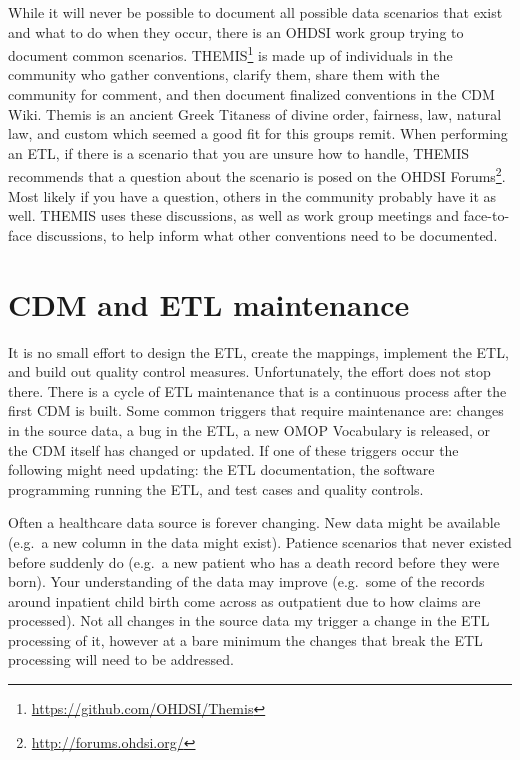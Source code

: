\documentclass[11pt]{book}
\let\rmarkdownfootnote\footnote%
\def\footnote{\protect\rmarkdownfootnote}
\theoremstyle{definition}
\theoremstyle{definition}
\theoremstyle{definition}
\theoremstyle{remark}
\begin{document}
While it will never be possible to document all possible data scenarios that exist and what to do when they occur, there is an OHDSI work group trying to document common scenarios. THEMIS\footnote{\url{https://github.com/OHDSI/Themis}} is made up of individuals in the community who gather conventions, clarify them, share them with the community for comment, and then document finalized conventions in the CDM Wiki. Themis is an ancient Greek Titaness of divine order, fairness, law, natural law, and custom which seemed a good fit for this groups remit. When performing an ETL, if there is a scenario that you are unsure how to handle, THEMIS recommends that a question about the scenario is posed on the OHDSI Forums\footnote{\url{http://forums.ohdsi.org/}}. Most likely if you have a question, others in the community probably have it as well. THEMIS uses these discussions, as well as work group meetings and face-to-face discussions, to help inform what other conventions need to be documented.

\hypertarget{CDMandETLMaintenance}{%
\section{CDM and ETL maintenance}\label{CDMandETLMaintenance}}

It is no small effort to design the ETL, create the mappings, implement the ETL, and build out quality control measures. Unfortunately, the effort does not stop there. There is a cycle of ETL maintenance that is a continuous process after the first CDM is built. Some common triggers that require maintenance are: changes in the source data, a bug in the ETL, a new OMOP Vocabulary is released, or the CDM itself has changed or updated. If one of these triggers occur the following might need updating: the ETL documentation, the software programming running the ETL, and test cases and quality controls.

Often a healthcare data source is forever changing. New data might be available (e.g.~a new column in the data might exist). Patience scenarios that never existed before suddenly do (e.g.~a new patient who has a death record before they were born). Your understanding of the data may improve (e.g.~some of the records around inpatient child birth come across as outpatient due to how claims are processed). Not all changes in the source data my trigger a change in the ETL processing of it, however at a bare minimum the changes that break the ETL processing will need to be addressed.
\end{document}
